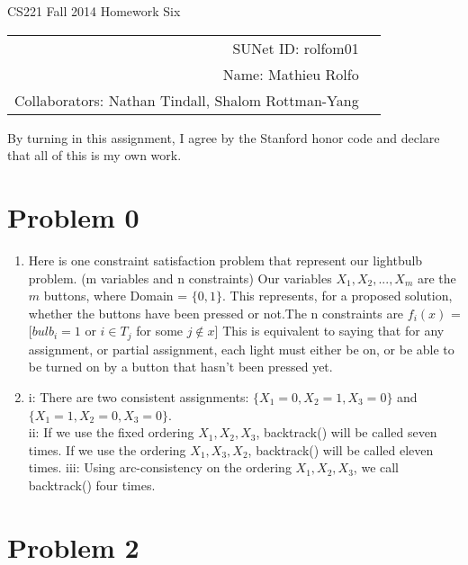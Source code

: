 \documentclass[12pt]{article}
\begin{document}
\begin{center}
{\Large CS221 Fall 2014 Homework Six}

\begin{tabular}{rl}
\\ 
SUNet ID: rolfom01 \\
Name: Mathieu Rolfo \\
Collaborators: Nathan Tindall, Shalom Rottman-Yang \\
\end{tabular}
\end{center}

By turning in this assignment, I agree by the Stanford honor code and declare
that all of this is my own work.

\section*{Problem 0}

\begin{enumerate}[label=(\alph*)]
  \item Here is one constraint satisfaction problem that represent our lightbulb problem. (m variables and n constraints) Our variables $X_1, X_2, ..., X_m$ are the $m$ buttons, where Domain = $\{0, 1\}$. This represents, for a proposed solution, whether the buttons have been pressed or not.The n constraints are $f_i(x)$ = [$bulb_i = 1$ or $i \in T_j $ for some $j\notin x$] This is equivalent to saying that for any assignment, or partial assignment, each light must either be on, or be able to be turned on by a button that hasn't been pressed yet.  
   \item i: There are two consistent assignments: $\{X_1 = 0, X_2 = 1, X_3 = 0\} $ and $ \{X_1 = 1, X_2 = 0, X_3 = 0\}$. \\
   	ii: If we use the fixed ordering $X_1, X_2, X_3$, backtrack() will be called seven times. If we use the ordering $X_1, X_3, X_2$, backtrack() will be called eleven times. 
	iii: Using arc-consistency on the ordering $X_1, X_2, X_3$, we call backtrack() four times.
  
 \end{enumerate}
 
\section*{Problem 2}
\end{document}
